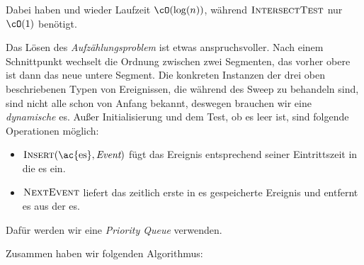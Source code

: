 \documentclass[language=ngerman,algolist,acrolist]{TemplateLecture}
\begin{document}
Dabei haben \Insert{} und \Delete{} wieder Laufzeit $\cO(\log(n))$, während $\textsc{IntersectTest}$ nur $\cO(1)$ benötigt.

Das Lösen des \emph{Aufzählungsproblem} ist etwas anspruchsvoller. Nach einem Schnittpunkt wechselt die Ordnung zwischen zwei Segmenten, das vorher obere ist dann das neue untere Segment. Die konkreten Instanzen der drei oben beschriebenen Typen von Ereignissen, die während des Sweep zu behandeln sind, sind nicht alle schon von Anfang bekannt, deswegen brauchen wir eine \emph{dynamische} \ac{es}. Außer Initialisierung und dem Test, ob \ac{es} leer ist, sind folgende Operationen möglich:
\begin{itemize}
    \item $\Insert(\text{\ac{es}},\event)$ fügt das Ereignis \event{} entsprechend seiner Eintrittszeit in die \ac{es} ein.
    \item $\textsc{NextEvent}$ liefert das zeitlich erste in \ac{es} gespeicherte Ereignis und entfernt es aus der \ac{es}.
\end{itemize}

Dafür werden wir eine \emph{Priority Queue} verwenden.

Zusammen haben wir folgenden Algorithmus:

\begin{algorithm}[h]
    \caption{\textsc{FindAllIntersections-2D}}\label{alg:findAllIntersections2D}
    \begin{algorithmic}[1]
            \Else{} 
                \Else{}
                \EndIf{}
            \EndIf{}
        \EndWhile{}
    \end{algorithmic}
\end{algorithm}
\end{document}
